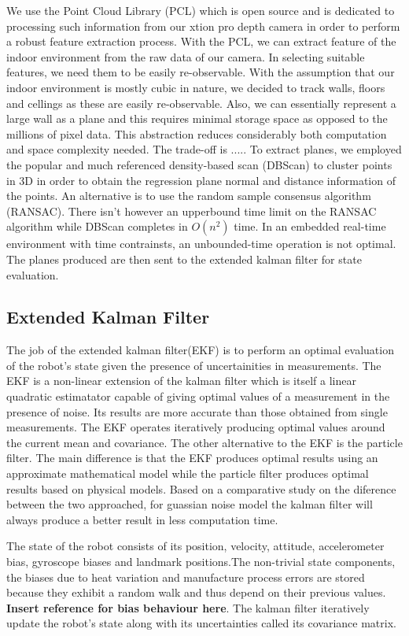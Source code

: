 \documentclass[]{article}
\begin{document}
{We use the Point Cloud Library (PCL) which is open source and is dedicated to processing such information from our xtion pro depth camera in order to perform a robust feature extraction process. With the PCL, we can extract feature of the indoor environment from the raw data of our camera. In selecting suitable features, we need them to be easily re-observable. With the assumption that our indoor environment is mostly cubic in nature, we decided to track walls, floors and cellings as these are easily re-observable. Also, we can essentially represent a large wall as a plane and this requires minimal storage space as opposed to the millions of pixel data. This abstraction reduces considerably both computation and space complexity needed. The trade-off is .....
To extract planes, we employed the popular and much referenced density-based scan (DBScan) to cluster points in 3D in order to obtain the regression plane normal and distance information of the points. An alternative is to use the random sample consensus algorithm (RANSAC). There isn't however an upperbound time limit on the RANSAC algorithm while DBScan completes in $O(n^{2})$ time. In an embedded real-time environment with time contrainsts, an unbounded-time operation is not optimal. The planes produced are then sent to the extended kalman filter for state evaluation.

\subsection{Extended Kalman Filter}
The job of the extended kalman filter(EKF) is to perform an optimal evaluation of the robot's state given the presence of uncertainities in measurements. The EKF is a non-linear extension of the kalman filter which is itself a linear quadratic estimatator capable of giving optimal values of a measurement in the presence of noise. Its results are more accurate than those obtained from single measurements. The EKF operates iteratively producing optimal values around the current mean and covariance. The other alternative to the EKF is the particle filter. The main difference is that the EKF produces optimal results using an approximate mathematical model while the particle filter produces optimal results based on physical models.
\cite{CompareFilters}Based on a comparative study on the diference between the two approached, for guassian noise model the kalman filter will always produce a better result in less computation time.

The state of the robot consists of its position, velocity, attitude, accelerometer bias, gyroscope biases  and landmark positions.The non-trivial state components, the biases due to heat variation and manufacture process errors are stored because they exhibit a random walk and thus depend on their previous values. \textbf{Insert reference for bias behaviour here}. The kalman filter iteratively update the robot's state along with its uncertainties called its covariance matrix.

}
\end{document}
